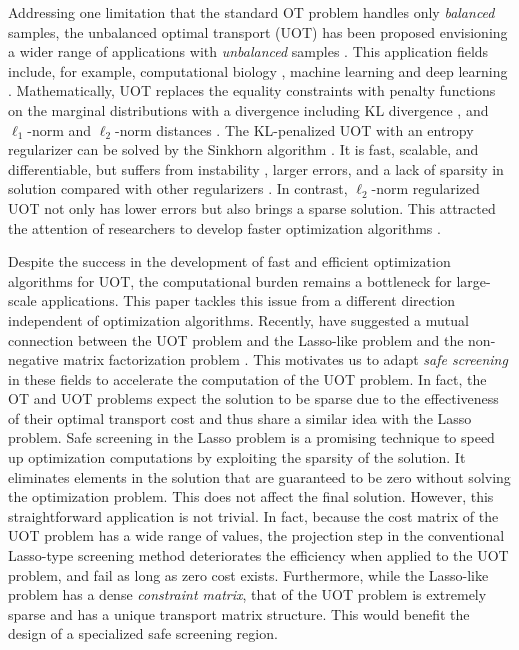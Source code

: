 \documentclass[twoside]{article}
\theoremstyle{plain}
\begin{document}
Addressing one limitation that the standard OT problem handles only {\it balanced} samples, the unbalanced optimal transport (UOT) has been proposed envisioning a wider range of applications with {\it unbalanced} samples \citep{Caffarelli_AM_2010,chizat2017scaling}. This application fields include, for example, computational biology \citep{Schiebinger_CELL_2019}, machine learning \citep{Janati_AISTATS_2019} and deep learning \citep{Yang_ICLR_2019}. Mathematically, UOT replaces the equality constraints with penalty functions on the marginal distributions with a divergence including KL divergence \citep{Liero:2018wo}, and $\ell_1$-norm \citep{Caffarelli_AM_2010} and $\ell_2$-norm distances \citep{refId0}. The KL-penalized UOT with an entropy regularizer can be solved by the Sinkhorn algorithm \citep{UOTSinkhorn2020}. It is fast, scalable, and differentiable, but suffers from instability \citep{DBLP:journals/corr/Schmitzer16}, larger errors, and a lack of sparsity in solution compared with other regularizers \citep{Blondel_AISTATS_2018}. In contrast, $\ell_2$-norm regularized UOT not only has lower errors but also brings a sparse solution. This attracted the attention of researchers to develop faster optimization algorithms \citep{Blondel_AISTATS_2018, Nguyen_arXiv_2022}.

Despite the success in the development of fast and efficient optimization algorithms for UOT, the computational burden remains a bottleneck for large-scale applications. This paper tackles this issue from a different direction independent of optimization algorithms. Recently, \cite{Chapel_NeurIPS_2021} have suggested a mutual connection between the UOT problem and the Lasso-like problem \citep{Tibshirani_JRSS_1996,Efron_AM_2004} and the non-negative matrix factorization problem \citep{Lee_NIPS_2000}. This motivates us to adapt {\it safe screening} \citep{ghaoui2010safe} in these fields to accelerate the computation of the UOT problem. In fact, the OT and UOT problems expect the solution to be sparse due to the effectiveness of their optimal transport cost and thus share a similar idea with the Lasso problem. Safe screening in the Lasso problem is a promising technique to speed up optimization computations by exploiting the sparsity of the solution. It eliminates elements in the solution that are guaranteed to be zero without solving the optimization problem. This does not affect the final solution. However, this straightforward application is not trivial. In fact, because the cost matrix of the UOT problem has a wide range of values, the projection step in the conventional Lasso-type screening method deteriorates the efficiency when applied to the UOT problem, and fail as long as zero cost exists. Furthermore, while the Lasso-like problem has a dense {\it constraint matrix}, that of the UOT problem is extremely sparse and has a unique transport matrix structure. This would benefit the design of a specialized safe screening region.
\end{document}
